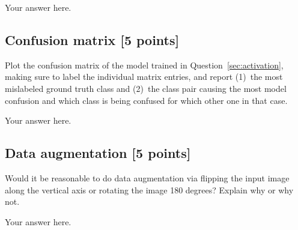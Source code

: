 \documentclass[a4paper]{article}
\theoremstyle{definition}
\begin{document}
{\color{blue} Your answer here.}

\subsection{Confusion matrix [5 points]}\label{sec:confusion}

Plot the confusion matrix of the model trained in Question~\ref{sec:activation}, making sure to label the individual matrix entries, and report (1)~the most mislabeled ground truth class and (2)~the class pair causing the most model confusion and which class is being confused for which other one in that case.

{\color{blue} Your answer here.}
	
\subsection{Data augmentation [5 points]}

Would it be reasonable to do data augmentation via flipping the input image along the vertical axis or rotating the image 180 degrees?
Explain why or why not.

{\color{blue} Your answer here.}
\end{document}
